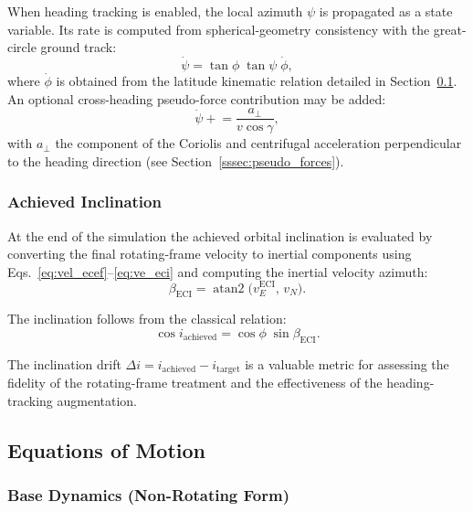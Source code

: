 When heading tracking is enabled, the local azimuth $\psi$ is propagated as a
state variable.  Its rate is computed from spherical-geometry consistency with
the great-circle ground track:
\begin{equation}
  \dot\psi = \tan\phi\;\tan\psi\;\dot\phi,
  \label{eq:psi_dot}
\end{equation}
where $\dot\phi$ is obtained from the latitude kinematic relation detailed in
Section~\ref{ssec:eom}.  An optional cross-heading pseudo-force contribution
may be added:
\begin{equation}
  \dot\psi \mathrel{+}= \frac{a_{\perp}}{v\cos\gamma},
  \label{eq:psi_pseudo}
\end{equation}
with $a_{\perp}$ the component of the Coriolis and centrifugal acceleration
perpendicular to the heading direction (see Section~\ref{sssec:pseudo_forces}).

\subsubsection{Achieved Inclination}
\label{sssec:achieved_inclination}

At the end of the simulation the achieved orbital inclination is evaluated by
converting the final rotating-frame velocity to inertial components using
Eqs.~\eqref{eq:vel_ecef}--\eqref{eq:ve_eci} and computing the inertial
velocity azimuth:
\begin{equation}
  \beta_{\text{ECI}} = \operatorname{atan2}\!\bigl(v_E^{\text{ECI}},\, v_N\bigr).
  \label{eq:beta_eci}
\end{equation}

The inclination follows from the classical relation:
\begin{equation}
  \cos i_{\text{achieved}} = \cos\phi\;\sin\beta_{\text{ECI}}.
  \label{eq:inc_achieved}
\end{equation}

The inclination drift $\Delta i = i_{\text{achieved}} - i_{\text{target}}$ is
a valuable metric for assessing the fidelity of the rotating-frame treatment
and the effectiveness of the heading-tracking augmentation.

\subsection{Equations of Motion}
\label{ssec:eom}

\subsubsection{Base Dynamics (Non-Rotating Form)}

